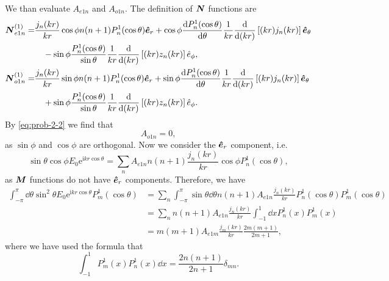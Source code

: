 \documentclass[hyperref, a4paper]{article}
\newcommand*{\ii}{\mathrm{i}}
\newcommand*{\ee}{\mathrm{e}}
\begin{document}
We than evaluate $A_{e1n}$ and $A_{o1n}$. The definition of $\vb*{N}$ functions are
\begin{equation}
    \begin{aligned}
        \boldsymbol{N}^{(1)}_{e 1 n}=& \frac{j_{n}(k r)}{k r} \cos \phi n(n+1) P_{n}^{1}(\cos \theta) \vu*{e}_{r} +\cos \phi \frac{\mathrm{d} P_{n}^{1}(\cos \theta)}{\mathrm{d} \theta} \frac{1}{k r} \frac{\mathrm{d}}{\mathrm{d}(k r)}\left[(k r) j_{n}(k r)\right] \vu*{e}_{\theta}  \\
        &\quad - \sin  \phi \frac{P_{n}^{1}(\cos \theta)}{\sin \theta} \frac{1}{k r} \frac{\mathrm{d}}{\mathrm{d}(k r)}\left[(k r) z_{n}(k r)\right] \hat{e}_{\phi}, \\
        \boldsymbol{N}^{(1)}_{o 1 n}=& \frac{j_{n}(k r)}{k r} \sin \phi n(n+1) P_{n}^{1}(\cos \theta) \vu*{e}_{r} +\sin \phi \frac{\mathrm{d} P_{n}^{1}(\cos \theta)}{\mathrm{d} \theta} \frac{1}{k r} \frac{\mathrm{d}}{\mathrm{d}(k r)}\left[(k r) j_{n}(k r)\right] \vu*{e}_{\theta} \\
        &\quad + \sin \phi \frac{P_{n}^{1}(\cos \theta)}{\sin \theta} \frac{1}{k r} \frac{\mathrm{d}}{\mathrm{d}(k r)}\left[(k r) z_{n}(k r)\right] \hat{e}_{\phi} .
        \end{aligned}
\end{equation}
By \eqref{eq:prob-2-2} we find that 
\begin{equation}
    A_{o1n} = 0,
    \label{eq:ao1n-0}
\end{equation}
as $\sin \phi$ and $\cos \phi$ are orthogonal. Now we consider the $\vu*{e}_r$ component, i.e.
\[
    \sin\theta \cos\phi E_0 \ee^{\ii k r \cos\theta} = \sum_n A_{e1n} n(n+1) \frac{j_n(kr)}{kr} \cos \phi P_{n}^{1}(\cos \theta),
\] 
as $\vb*{M}$ functions do not have $\vu*{e}_r$ components.
Therefore, we have 
\begin{equation}
    \begin{aligned}
        \int_{-\pi}^\pi \dd{\theta} \sin^2\theta E_0 \ee^{\ii k r \cos\theta} P_m^1(\cos\theta) &= \sum_n \int_{-\pi}^\pi \sin\theta \dd{\theta} n(n+1) A_{e1n} \frac{j_n(kr)}{kr} P_n^1(\cos\theta) P_m^1(\cos\theta) \\
        &= \sum_n n(n+1) A_{e1n} \frac{j_n(kr)}{kr} \int_{-1}^1 \dd{x} P_n^1(x) P_m^1(x) \\
        &= m(m+1) A_{e1m} \frac{j_m(kr)}{kr} \frac{2m (m+1)}{2m+1},
    \end{aligned}
    \label{eq:ae1m-step-1}
\end{equation}
where we have used the formula that 
\[
    \int^1_{-1} P^1_m(x) P^1_n(x) \dd{x} = \frac{2 n (n+1)}{2n+1} \delta_{mn}.
\]
\end{document}
